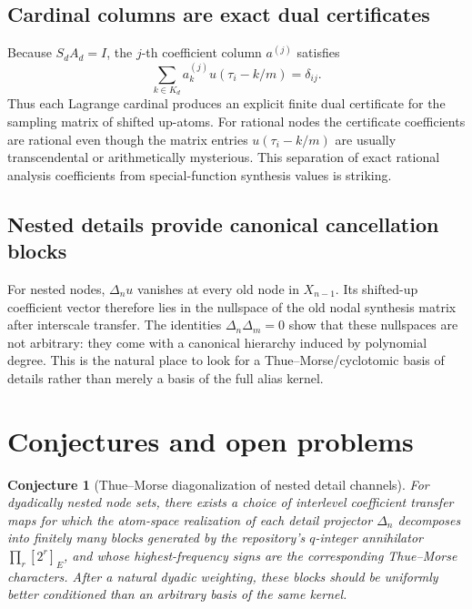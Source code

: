 \documentclass[11pt,oneside]{article}
\numberwithin{equation}{section}
\newtheorem{conjecture}[theorem]{Conjecture}
\theoremstyle{definition}
\theoremstyle{remark}
\begin{document}
\subsection{Cardinal columns are exact dual certificates}
Because \(S_dA_d=I\), the \(j\)-th coefficient column \(a^{(j)}\) satisfies
\begin{equation}
 \sum_{k\in K_d}a_k^{(j)}u(\tau_i-k/m)=\delta_{ij}.
 \label{eq:dual-cert}
\end{equation}
Thus each Lagrange cardinal produces an explicit finite dual certificate for the
sampling matrix of shifted up-atoms.  For rational nodes the certificate
coefficients are rational even though the matrix entries \(u(\tau_i-k/m)\) are
usually transcendental or arithmetically mysterious.  This separation of exact
rational analysis coefficients from special-function synthesis values is striking.

\subsection{Nested details provide canonical cancellation blocks}
For nested nodes, \(\Delta_nu\) vanishes at every old node in \(X_{n-1}\).  Its
shifted-up coefficient vector therefore lies in the nullspace of the old nodal
synthesis matrix after interscale transfer.  The identities
\(\Delta_n\Delta_m=0\) show that these nullspaces are not arbitrary: they come with
a canonical hierarchy induced by polynomial degree.  This is the natural place to
look for a Thue--Morse/cyclotomic basis of details rather than merely a basis of the
full alias kernel.

\section{Conjectures and open problems}
\label{sec:conjectures}

\begin{conjecture}[Thue--Morse diagonalization of nested detail channels]
\label{conj:tm-details}
For dyadically nested node sets, there exists a choice of interlevel coefficient
transfer maps for which the atom-space realization of each detail projector
\(\Delta_n\) decomposes into finitely many blocks generated by the repository's
\(q\)-integer annihilator
\(\prod_{r}[2^r]_E\), and whose highest-frequency signs are the corresponding
Thue--Morse characters.  After a natural dyadic weighting, these blocks should be
uniformly better conditioned than an arbitrary basis of the same kernel.
\end{conjecture}
\end{document}
